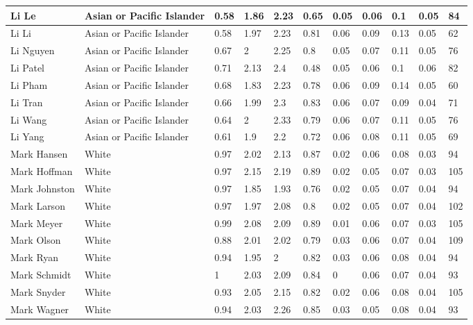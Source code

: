 \begin{table}[!ht]
\begin{tabular}{|l|l|l|l|l|l|l|l|l|l|l|}
        Li Le & Asian or Pacific Islander & 0.58 & 1.86 & 2.23 & 0.65 & 0.05 & 0.06 & 0.1 & 0.05 & 84 \\ \hline
        Li Li & Asian or Pacific Islander & 0.58 & 1.97 & 2.23 & 0.81 & 0.06 & 0.09 & 0.13 & 0.05 & 62 \\ \hline
        Li Nguyen & Asian or Pacific Islander & 0.67 & 2 & 2.25 & 0.8 & 0.05 & 0.07 & 0.11 & 0.05 & 76 \\ \hline
        Li Patel & Asian or Pacific Islander & 0.71 & 2.13 & 2.4 & 0.48 & 0.05 & 0.06 & 0.1 & 0.06 & 82 \\ \hline
        Li Pham & Asian or Pacific Islander & 0.68 & 1.83 & 2.23 & 0.78 & 0.06 & 0.09 & 0.14 & 0.05 & 60 \\ \hline
        Li Tran & Asian or Pacific Islander & 0.66 & 1.99 & 2.3 & 0.83 & 0.06 & 0.07 & 0.09 & 0.04 & 71 \\ \hline
        Li Wang & Asian or Pacific Islander & 0.64 & 2 & 2.33 & 0.79 & 0.06 & 0.07 & 0.11 & 0.05 & 76 \\ \hline
        Li Yang & Asian or Pacific Islander & 0.61 & 1.9 & 2.2 & 0.72 & 0.06 & 0.08 & 0.11 & 0.05 & 69 \\ \hline
        Mark Hansen & White & 0.97 & 2.02 & 2.13 & 0.87 & 0.02 & 0.06 & 0.08 & 0.03 & 94 \\ \hline
        Mark Hoffman & White & 0.97 & 2.15 & 2.19 & 0.89 & 0.02 & 0.05 & 0.07 & 0.03 & 105 \\ \hline
        Mark Johnston & White & 0.97 & 1.85 & 1.93 & 0.76 & 0.02 & 0.05 & 0.07 & 0.04 & 94 \\ \hline
        Mark Larson & White & 0.97 & 1.97 & 2.08 & 0.8 & 0.02 & 0.05 & 0.07 & 0.04 & 102 \\ \hline
        Mark Meyer & White & 0.99 & 2.08 & 2.09 & 0.89 & 0.01 & 0.06 & 0.07 & 0.03 & 105 \\ \hline
        Mark Olson & White & 0.88 & 2.01 & 2.02 & 0.79 & 0.03 & 0.06 & 0.07 & 0.04 & 109 \\ \hline
        Mark Ryan & White & 0.94 & 1.95 & 2 & 0.82 & 0.03 & 0.06 & 0.08 & 0.04 & 94 \\ \hline
        Mark Schmidt & White & 1 & 2.03 & 2.09 & 0.84 & 0 & 0.06 & 0.07 & 0.04 & 93 \\ \hline
        Mark Snyder & White & 0.93 & 2.05 & 2.15 & 0.82 & 0.02 & 0.06 & 0.08 & 0.04 & 105 \\ \hline
        Mark Wagner & White & 0.94 & 2.03 & 2.26 & 0.85 & 0.03 & 0.05 & 0.08 & 0.04 & 93 \\ \hline

\end{tabular}
\end{table}
